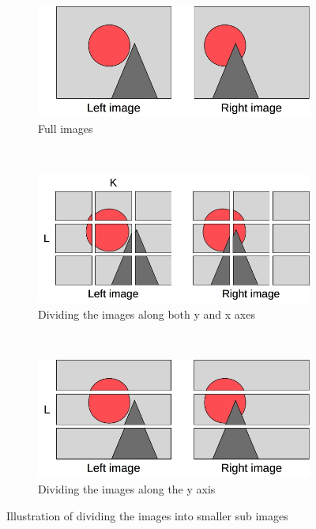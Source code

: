 \begin{figure}[!ht]
  \centering
  \begin{subfigure}[t]{0.9\textwidth}
    \centering\includegraphics[scale=0.45]{figures/imgdiv1}
    \caption{Full images\label{fig:imgdiv1}}
  \end{subfigure}\\
  \begin{subfigure}[t]{0.9\textwidth}
    \centering\includegraphics[scale=0.45]{figures/imgdiv2}
    \caption{Dividing the images along both y and x axes\label{fig:imgdiv2}}
  \end{subfigure}\\ \vspace{0.5cm}
  \begin{subfigure}[t]{0.9\textwidth}
    \centering\includegraphics[scale=0.45]{figures/imgdiv3}
    \caption{Dividing the images along the y axis\label{fig:imgdiv3}}
  \end{subfigure}
  \caption{Illustration of dividing the images into smaller sub images\label{fig:imgdiv}}
\end{figure}


